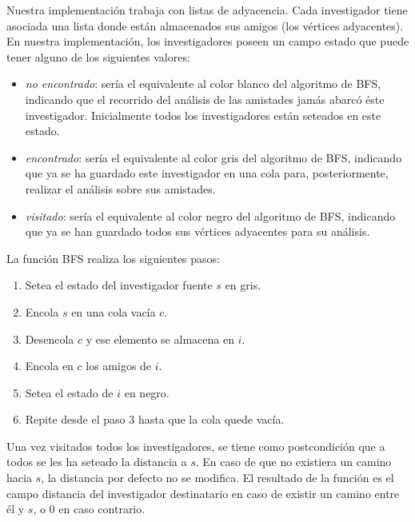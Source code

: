 \indent Nuestra implementación trabaja con listas de adyacencia. Cada
investigador tiene asociada una lista donde están almacenados sus amigos (los
vértices adyacentes).\\

\indent En nuestra implementación, los investigadores poseen un campo estado que
puede tener alguno de los siguientes valores:

\begin{itemize}
\item \textit{no encontrado}: sería el equivalente al color blanco del algoritmo
de BFS, indicando que el recorrido del análisis de las amistades jamás abarcó
éste investigador. Inicialmente todos los investigadores están seteados
en este estado.
\item \textit{encontrado}: sería el equivalente al color gris del algoritmo de
BFS, indicando que ya se ha guardado este investigador en una cola para,
posteriormente, realizar el análisis sobre sus amistades.
\item \textit{visitado}: sería el equivalente al color negro del algoritmo de
BFS, indicando que ya se han guardado todos sus vértices adyacentes para su
análisis.
\end{itemize}

\hspace{-0.5cm}La función BFS realiza los siguientes pasos:
\begin{enumerate}
 \item Setea el estado del investigador fuente $s$ en gris.
 \item Encola $s$ en una cola vacía $c$.
 \item Desencola $c$ y ese elemento se almacena en $i$.
 \item Encola en $c$ los amigos de $i$.
 \item Setea el estado de $i$ en negro.
 \item Repite desde el paso 3 hasta que la cola quede vacía.
\end{enumerate}

\indent Una vez visitados todos los investigadores, se tiene como
postcondición que a todos se les ha seteado la distancia a $s$. En caso de que
no existiera un 
camino hacia $s$, la distancia por defecto no se modifica. 
El resultado de la función es el campo distancia del investigador destinatario
en caso de existir
un camino entre él y $s$, o 0 en caso contrario.

